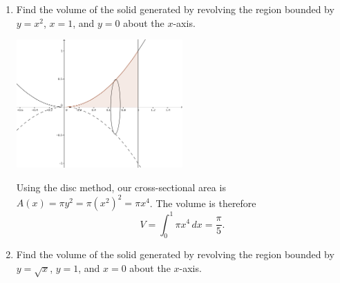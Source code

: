 \documentclass[12pt]{article}
\begin{document}
\thispagestyle{fancy}

\begin{enumerate}
 \item Find the volume of the solid generated by revolving the region bounded by $y=x^2$, $x=1$, and $y=0$ about the $x$-axis.

\begin{center}
 \includegraphics[width=0.5\textwidth]{WS5-1.png}
\end{center}

Using the disc method, our cross-sectional area is $A(x) = \pi y^2 = \pi(x^2)^2 = \pi x^4$. The volume is therefore
\[
 V = \int_0^1 \pi x^4\,dx = \frac{\pi}{5}.
\]

 \item Find the volume of the solid generated by revolving the region bounded by $y=\sqrt{x}$, $y=1$, and $x=0$ about the $x$-axis.


\end{enumerate}
\end{document}
